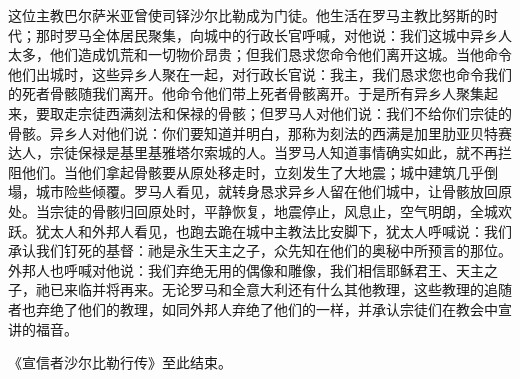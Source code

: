 这位主教巴尔萨米亚曾使司铎沙尔比勒成为门徒。他生活在罗马主教比努斯的时代；那时罗马全体居民聚集，向城中的行政长官呼喊，对他说：我们这城中异乡人太多，他们造成饥荒和一切物价昂贵；但我们恳求您命令他们离开这城。当他命令他们出城时，这些异乡人聚在一起，对行政长官说：我主，我们恳求您也命令我们的死者骨骸随我们离开。他命令他们带上死者骨骸离开。于是所有异乡人聚集起来，要取走宗徒西满刻法和保禄的骨骸；但罗马人对他们说：我们不给你们宗徒的骨骸。异乡人对他们说：你们要知道并明白，那称为刻法的西满是加里肋亚贝特赛达人，宗徒保禄是基里基雅塔尔索城的人。当罗马人知道事情确实如此，就不再拦阻他们。当他们拿起骨骸要从原处移走时，立刻发生了大地震；城中建筑几乎倒塌，城市险些倾覆。罗马人看见，就转身恳求异乡人留在他们城中，让骨骸放回原处。当宗徒的骨骸归回原处时，平静恢复，地震停止，风息止，空气明朗，全城欢跃。犹太人和外邦人看见，也跑去跪在城中主教法比安脚下，犹太人呼喊说：我们承认我们钉死的基督：祂是永生天主之子，众先知在他们的奥秘中所预言的那位。外邦人也呼喊对他说：我们弃绝无用的偶像和雕像，我们相信耶稣君王、天主之子，祂已来临并将再来。无论罗马和全意大利还有什么其他教理，这些教理的追随者也弃绝了他们的教理，如同外邦人弃绝了他们的一样，并承认宗徒们在教会中宣讲的福音。\par

《宣信者沙尔比勒行传》至此结束。\par

